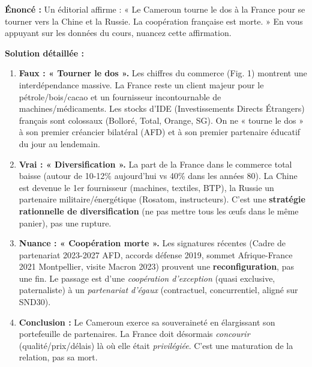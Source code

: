 \documentclass[11pt]{article}
\newcommand{\cle}[1]{{\popxbold\color{popdark}#1}}
\begin{document}
\begin{exoresolu}
\textbf{Énoncé :} Un éditorial affirme : « Le Cameroun tourne le dos à la France pour se tourner vers la Chine et la Russie. La coopération française est morte. » En vous appuyant sur les données du cours, nuancez cette affirmation.

\textbf{Solution détaillée :}
\begin{enumerate}
    \item \textbf{Faux : « Tourner le dos ».} Les chiffres du commerce (Fig. 1) montrent une interdépendance massive. La France reste un client majeur pour le pétrole/bois/cacao et un fournisseur incontournable de machines/médicaments. Les stocks d'IDE (Investissements Directs Étrangers) français sont colossaux (Bolloré, Total, Orange, SG). On ne « tourne le dos » à son premier créancier bilatéral (AFD) et à son premier partenaire éducatif du jour au lendemain.
    \item \textbf{Vrai : « Diversification ».} La part de la France dans le commerce total baisse (autour de 10-12\% aujourd'hui vs 40\% dans les années 80). La Chine est devenue le 1er fournisseur (machines, textiles, BTP), la Russie un partenaire militaire/énergétique (Rosatom, instructeurs). C'est une \textbf{stratégie rationnelle de diversification} (ne pas mettre tous les œufs dans le même panier), pas une rupture.
    \item \textbf{Nuance : « Coopération morte ».} Les signatures récentes (Cadre de partenariat 2023-2027 AFD, accords défense 2019, sommet Afrique-France 2021 Montpellier, visite Macron 2023) prouvent une \textbf{reconfiguration}, pas une fin. Le passage est d'une \emph{coopération d'exception} (quasi exclusive, paternaliste) à un \emph{partenariat d'égaux} (contractuel, concurrentiel, aligné sur SND30).
    \item \textbf{Conclusion :} Le Cameroun exerce sa \cle{souveraineté} en élargissant son portefeuille de partenaires. La France doit désormais \emph{concourir} (qualité/prix/délais) là où elle était \emph{privilégiée}. C'est une maturation de la relation, pas sa mort.
\end{enumerate}
\end{exoresolu}
\end{document}
